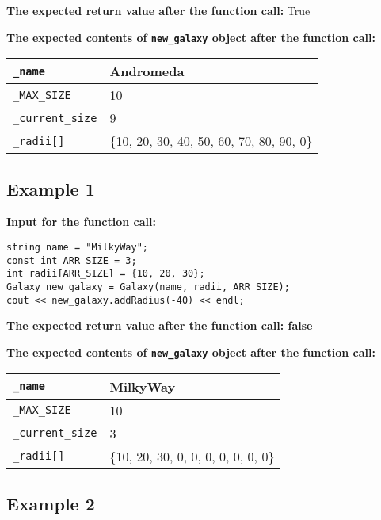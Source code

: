 \textbf{The expected return value after the function call:}
True

\textbf{The expected contents of \texttt{new\_galaxy} object after the function call:}

\begin{table}[H]
    \centering
    \begin{tabular}{p{2in}|p{4in}}
        \texttt{\_name} & Andromeda \\
        \hline
        \texttt{\_MAX\_SIZE} & 10 \\
        \hline
        \texttt{\_current\_size} & 9 \\
        \hline
        \texttt{\_radii[]} & \{10, 20, 30, 40, 50, 60, 70, 80, 90, 0\} \\
    \end{tabular}
\end{table}

\subsection*{Example 1}

\textbf{Input for the function call:}

\begin{verbatim}
string name = "MilkyWay";
const int ARR_SIZE = 3;
int radii[ARR_SIZE] = {10, 20, 30};
Galaxy new_galaxy = Galaxy(name, radii, ARR_SIZE);
cout << new_galaxy.addRadius(-40) << endl;
\end{verbatim}

\textbf{The expected return value after the function call: false}



\textbf{The expected contents of \texttt{new\_galaxy} object after the function call:}

\begin{table}[H]
    \centering
    \begin{tabular}{p{2in}|p{4in}}
        \texttt{\_name} & MilkyWay \\
        \hline
        \texttt{\_MAX\_SIZE} & 10 \\
        \hline
        \texttt{\_current\_size} & 3 \\
        \hline
        \texttt{\_radii[]} & \{10, 20, 30, 0, 0, 0, 0, 0, 0, 0\} \\
    \end{tabular}
\end{table}

\subsection*{Example 2}

